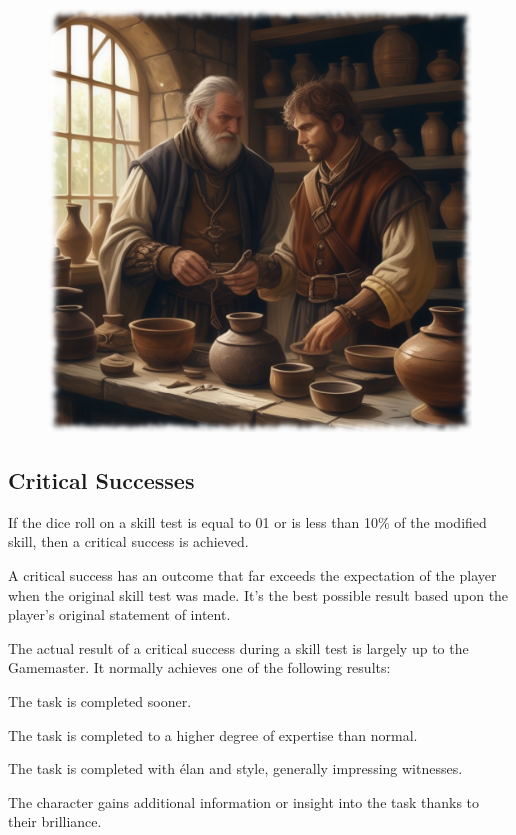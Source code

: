 \begin{figure}[h]
\begin{center}
\includegraphics[scale=0.23]{img/ai-images/potter-and-nobleman.png}
\end{center}
\end{figure}


\subsection{Critical Successes}
If the dice roll on a skill test is equal to 01 or is less than 10\% of the modified skill, then a critical success is achieved. 

A critical success has an outcome that far exceeds the expectation of the player when the original skill test was made. It’s the best possible result based upon the player’s original statement of intent.

The actual result of a critical success during a skill test is largely up to the Gamemaster. It normally achieves one of the following results: 

\begin{rpg-list}
\item The task is completed sooner. 
\item The task is completed to a higher degree of expertise than normal. 
\item The task is completed with élan and style, generally impressing witnesses. 
\item The character gains additional information or insight into the task thanks to their brilliance. 
\end{rpg-list}

